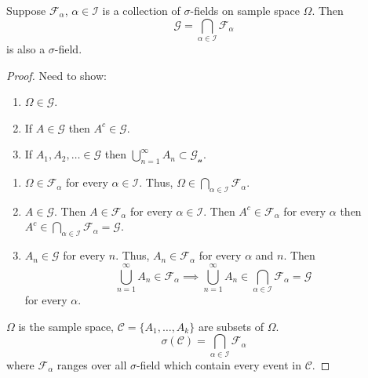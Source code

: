 \documentclass[10pt, a4paper]{article}
\begin{document}
\begin{proposition}
    Suppose $\mathcal{F}_{\alpha}$,
    $\alpha \in \mathcal{I}$ is a collection of $\sigma$-fields on sample space $\Omega$.
    Then
    \[
    \mathcal{G} = \bigcap_{\alpha \in \mathcal{I}}\mathcal{F}_{\alpha}
    \]
    is also a $\sigma$-field.

    \begin{proof}
        Need to show:
        \begin{enumerate}[label = (\alph*)]
            \item $\Omega \in \mathcal{G}$.
            
            \item If $A \in \mathcal{G}$ then $A ^ c \in \mathcal{G}$.
            
            \item If $A_1, A_2, \dotsc \in \mathcal{G}$ then $\bigcup_{n = 1}^{\infty}A_n \subset \mathcal{G_n}$.
        \end{enumerate}
    
        \begin{enumerate}[label = (\alph*)]
            \item $\Omega \in \mathcal{F}_{\alpha}$ for every $\alpha \in \mathcal{I}$.
            Thus,
            $\Omega \in \bigcap_{\alpha \in \mathcal{I}}\mathcal{F}_{\alpha}$.
    
            \item $A \in \mathcal{G}$.
            Then $A \in \mathcal{F}_{\alpha}$ for every $\alpha \in \mathcal{I}$.
            Then $A ^ c \in \mathcal{F}_{\alpha}$ for every $\alpha$ then $A ^ c \in \bigcap_{\alpha \in \mathcal{I}}\mathcal{F}_{\alpha} = \mathcal{G}$.
    
            \item $A_n \in \mathcal{G}$ for every $n$.
            Thus,
            $A_n \in \mathcal{F}_{\alpha}$ for every $\alpha$ and $n$.
            Then
            \[
            \bigcup_{n = 1}^{\infty}A_n \in \mathcal{F}_{\alpha} \implies \bigcup_{n = 1}^{\infty}A_n \in \bigcap_{\alpha \in \mathcal{I}}\mathcal{F}_{\alpha} = \mathcal{G}
            \]
            for every $\alpha$.
        \end{enumerate}
        $\Omega$ is the sample space,
        $\mathcal{C} = \{A_1, \dotsc, A_k\}$ are subsets of $\Omega$.
        \[
        \sigma(\mathcal{C}) = \bigcap_{\alpha \in \mathcal{I}}\mathcal{F}_{\alpha}
        \]
        where $\mathcal{F}_{\alpha}$ ranges over all $\sigma$-field which contain every event in $\mathcal{C}$.
    \end{proof}
\end{proposition}
\end{document}
